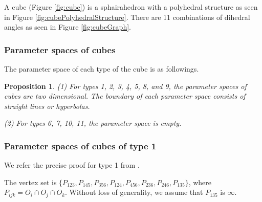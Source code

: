 \documentclass[suppldata, dvipdfmx]{interact}
\theoremstyle{plain}%
\newtheorem{lemma}[theorem]{Lemma}
\newtheorem{proposition}[theorem]{Proposition}
\theoremstyle{definition}
\theoremstyle{remark}
\theoremstyle{problemstyle}
\begin{document}



A cube (Figure \ref{fig:cube}) is a sphairahedron with a polyhedral structure as seen in Figure \ref{fig:cubePolyhedralStructure}.  There are 11 combinations of dihedral angles as seen in Figure \ref{fig:cubeGraph}.

\subsubsection{Parameter spaces of cubes}

The parameter space of each type of the cube is as followings.

\begin{proposition}\label{prop:paraSpace_cube}
(1) For types 1, 2, 3, 4, 5, 8, and 9, the parameter spaces of cubes are two dimensional.  The boundary of each parameter space consists of straight lines or hyperbolas. \par  
(2) For types 6, 7, 10, 11, the parameter space is empty.
\end{proposition}

\subsubsection{Parameter spaces of cubes of type 1}

We refer the precise proof for type 1 from \cite{AharaAraki2}.

The vertex set is $\{ P_{123}, P_{145}, P_{356}, P_{124}, P_{456}, P_{236}, P_{246}, P_{135} \}$, where $P_{ijk} = O_i \cap O_j \cap O_k$.  Without loss of generality, we assume that $P_{135}$ is $\infty$. 
\end{document}
